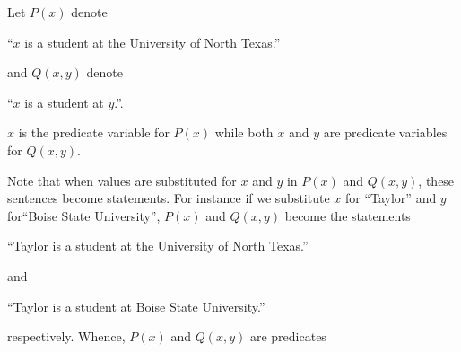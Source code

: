 \guard



\begin{exmp}
\label{exmp:predicates}
  Let $P(x)$ denote
    \begin{center}
      ``$x$ is a student at the University of North Texas.''
    \end{center}
    and $Q(x,y)$ denote
    \begin{center}
      ``$x$ is a student at $y$.''.
    \end{center}
  $x$ is the predicate variable for $P(x)$ while both $x$ and $y$ are predicate variables for $Q(x,y)$.

  Note that when values are substituted for $x$ and $y$ in $P(x)$ and $Q(x,y)$, these sentences become statements.
  For instance if we substitute $x$ for ``Taylor'' and $y$ for``Boise State University'', $P(x)$ and $Q(x,y)$ become the statements
    \begin{center}
      ``Taylor is a student at the University of North Texas.''
    \end{center}
    and
    \begin{center}
      ``Taylor is a student at Boise State University.''
    \end{center}
    respectively.
  Whence, $P(x)$ and $Q(x,y)$ are predicates
\end{exmp}
